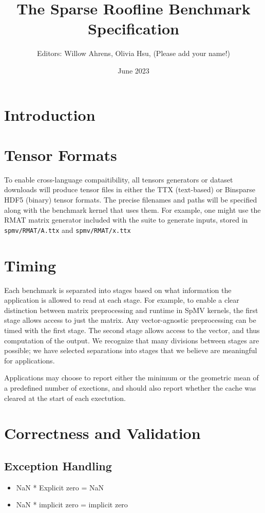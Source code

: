 \documentclass{article}
\title{The Sparse Roofline Benchmark Specification}
\author{Editors: Willow Ahrens, Olivia Hsu, (Please add your name!)}
\date{June 2023}
\begin{document}
\maketitle

\section{Introduction}

\section{Tensor Formats}

To enable cross-language compaitibility, all tensors generators or dataset downloads will produce tensor files in either the TTX (text-based) or Binsparse HDF5 (binary) tensor formats. The precise filenames and paths will be specified along with the benchmark kernel that uses them. For example, one might use the RMAT matrix generator included with the suite to generate inputs, stored in \texttt{spmv/RMAT/A.ttx} and \texttt{spmv/RMAT/x.ttx}

\section{Timing}

Each benchmark is separated into stages based on what information the application is allowed to read at each stage. For example, to enable a clear distinction between matrix preprocessing and runtime in SpMV kernels, the first stage allows access to just the matrix. Any vector-agnostic preprocessing can be timed with the first stage. The second stage allows access to the vector, and thus computation of the output. We recognize that many divisions between stages are possible; we have selected separations into stages that we believe are meaningful for applications.

Applications may choose to report either the minimum or the geometric mean of a predefined number of exections, and should also report whether the cache was cleared at the start of each exectution.

\section{Correctness and Validation}

\subsection{Exception Handling}
\begin{itemize}
\item NaN * Explicit zero = NaN

\item NaN * implicit zero = implicit zero
\end{itemize}
\end{document}
